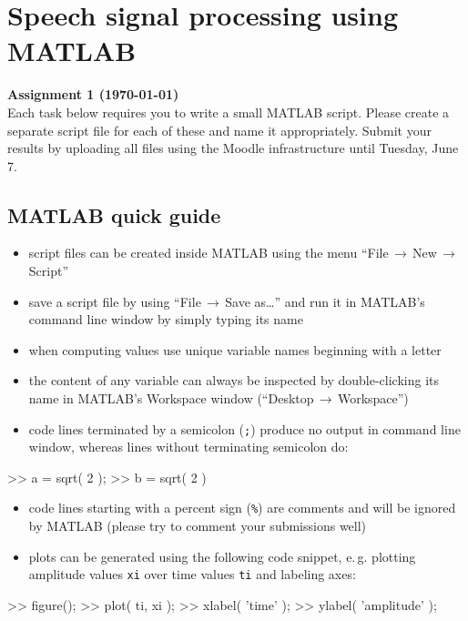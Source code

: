 \section*{Speech signal processing using MATLAB}
{\large{\textbf{Assignment 1 (\today)}}}\\

\noindent Each task below requires you to write a small MATLAB script. Please create a separate script file for each of these and name it appropriately. Submit your results by uploading all files using the Moodle infrastructure until Tuesday, June 7.

\subsection*{MATLAB quick guide}
\begin{itemize}
	\item script files can be created inside MATLAB using the menu ``File$\,\rightarrow\,$New$\,\rightarrow\,$Script''
	\item save a script file by using ``File$\,\rightarrow\,$Save as\ldots'' and run it in MATLAB's command line window by simply typing its name
	\item when computing values use unique variable names beginning with a letter
	\item the content of any variable can always be inspected by double-clicking its name in MATLAB's Workspace window (``Desktop$\,\rightarrow\,$Workspace'')
	\item code lines terminated by a semicolon (\texttt{;}) produce no output in command line window, whereas lines without terminating semicolon do:
\end{itemize}
\begin{code}
>> a = sqrt( 2 ); \color{medium}%
>> b = sqrt( 2 ) \color{medium}%
\end{code}
\begin{itemize}
	\item code lines starting with a percent sign (\texttt{\%}) are comments and will be ignored by MATLAB (please try to comment your submissions well)
	\item plots can be generated using the following code snippet, e.\,g. plotting amplitude values \texttt{xi} over time values \texttt{ti} and labeling axes:
\end{itemize}
\begin{code}
>> figure(); \color{medium}%
>> plot( ti, xi ); \color{medium}%
>> xlabel( 'time' ); \color{medium}%
>> ylabel( 'amplitude' ); \color{medium}%
\end{code}
